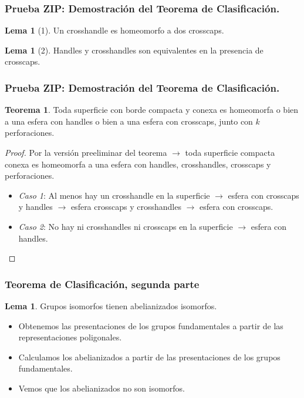 \documentclass{beamer}
\theoremstyle{definition}
\newtheorem{tma}[defin]{Teorema}
\newtheorem{lema}[defin]{Lema}
\begin{document}
\begin{frame}
\frametitle{Prueba ZIP: Demostración del Teorema de Clasificación.}
\begin{lema} [1]
Un crosshandle es homeomorfo a dos crosscaps.
\end{lema}

\begin{lema}[2]
Handles y crosshandles son equivalentes en la presencia de crosscaps.
\end{lema}
\end{frame}



\begin{frame}
\frametitle{Prueba ZIP: Demostración del Teorema de Clasificación.}
\begin{tma}
Toda superficie con borde compacta y conexa es homeomorfa o bien a una esfera con handles o bien a una esfera con crosscaps, junto con $k$ perforaciones.
\end{tma}
\begin{proof}
Por la versión preeliminar del teorema $\longrightarrow$ toda superficie compacta conexa es homeomorfa a una esfera con handles, crosshandles, crosscaps y perforaciones.

\begin{itemize}
\item \textit{Caso 1}: Al menos hay un crosshandle en la superficie $\rightarrow$ esfera con crosscaps y handles $\rightarrow$ esfera crosscaps y crosshandles $\rightarrow$ esfera con crosscaps.\pause
\item \textit{Caso 2}: No hay ni crosshandles ni crosscaps en la superficie $\rightarrow$ esfera con handles.
\end{itemize}
\end{proof}
\end{frame}

\begin{frame}
\frametitle{Teorema de Clasificación, segunda parte}
\begin{lema}
Grupos isomorfos tienen abelianizados isomorfos.
\end{lema}

\begin{itemize}
\item Obtenemos las presentaciones de los grupos fundamentales a partir de las representaciones poligonales.
\item Calculamos los abelianizados a partir de las presentaciones de los grupos fundamentales.
\item Vemos que los abelianizados no son isomorfos.

\end{itemize}
\end{frame}
\end{document}
